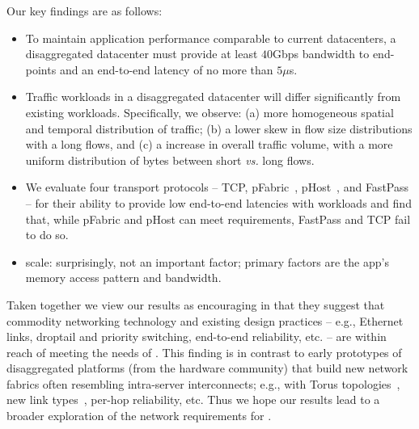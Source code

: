 \vspace{0.5em}
\noindent Our key findings are as follows:
\vspace{-0.5em}
\begin{itemize}[leftmargin=*]
	\itemsep0em
		\item To maintain application performance comparable to current datacenters, a disaggregated datacenter must provide at least $40$Gbps bandwidth to end-points and an end-to-end latency of no more than $5\mu$s.
		\item Traffic workloads in a disaggregated datacenter will differ significantly from existing workloads. Specifically, we observe: (a)  more homogeneous spatial and temporal distribution of traffic; (b) a  lower skew in flow size distributions with a long flows, and (c) a  increase in overall traffic volume, with a  more uniform distribution of bytes between short {\em vs.} long flows.
		\item We evaluate four transport protocols -- TCP, pFabric~\cite{pfabric}, pHost~\cite{phost}, and  FastPass~\cite{fastpass} -- for their ability to provide low end-to-end latencies with \dis workloads and find that, while pFabric and pHost can meet \dis requirements, FastPass and TCP fail to do so. 
		\item {} scale: surprisingly, not an important factor; primary factors are the app's memory access pattern and bandwidth.
		\end{itemize} 
	
	
Taken together we view our results as encouraging in that they suggest that commodity networking technology and existing design practices -- e.g., Ethernet links, droptail and priority switching, end-to-end reliability, etc. -- are within reach of meeting the needs of \dis. This finding is in contrast to early prototypes of disaggregated platforms (from the hardware community) that build new network fabrics often resembling intra-server interconnects; e.g., with Torus  topologies~\cite{sea-micro}, new link types~\cite{intel-si-photonics}, per-hop reliability, etc.  Thus we hope our results lead to a broader exploration of the network requirements for \dis.
	
